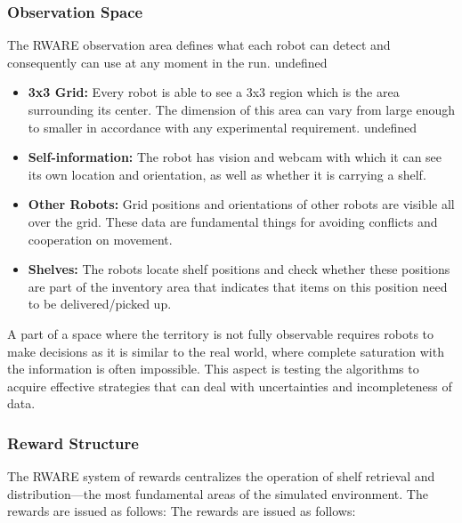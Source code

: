 \documentclass[11pt]{article}
\begin{document}
\subsubsection{Observation Space}

The RWARE observation area defines what each robot can detect and consequently can use at any moment in the run. undefined

\begin{itemize}
\item \textbf{3x3 Grid:} Every robot is able to see a 3x3 region which is the area surrounding its center. The dimension of this area can vary from large enough to smaller in accordance with any experimental requirement. undefined

\item \textbf{Self-information:} The robot has vision and webcam with which it can see its own location and orientation, as well as whether it is carrying a shelf.

\item \textbf{Other Robots:} Grid positions and orientations of other robots are visible all over the grid. These data are fundamental things for avoiding conflicts and cooperation on movement.

\item \textbf{Shelves:} The robots locate shelf positions and check whether these positions are part of the inventory area that indicates that items on this position need to be delivered/picked up.
\end{itemize}
A part of a space where the territory is not fully observable requires robots to make decisions as it is similar to the real world, where complete saturation with the information is often impossible. This aspect is testing the algorithms to acquire effective strategies that can deal with uncertainties and incompleteness of data.


\subsubsection{Reward Structure}

The RWARE system of rewards centralizes the operation of shelf retrieval and distribution—the most fundamental areas of the simulated environment. The rewards are issued as follows: The rewards are issued as follows:
\end{document}
